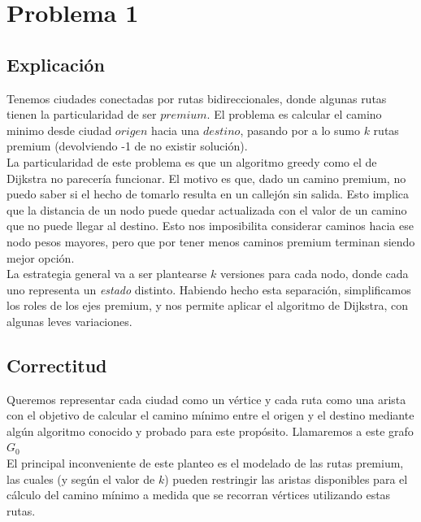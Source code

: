 
\section{Problema 1}

\subsection{Explicación}

Tenemos ciudades conectadas por rutas bidireccionales, donde algunas rutas tienen la particularidad de ser $premium$. El problema es calcular el camino minimo desde ciudad $origen$ hacia una $destino$, pasando por a lo sumo $k$ rutas premium (devolviendo -1 de no existir solución). \\

La particularidad de este problema es que un algoritmo greedy como el de Dijkstra no parecería funcionar. El motivo es que, dado un camino premium, no puedo saber si el hecho de tomarlo resulta en un callejón sin salida. Esto implica que la distancia de un nodo puede quedar actualizada con el valor de un camino que no puede llegar al destino. Esto nos imposibilita considerar caminos hacia ese nodo pesos mayores, pero que por tener menos caminos premium terminan siendo mejor opción. \\

La estrategia general va a ser plantearse $k$ versiones para cada nodo, donde cada uno representa un \textit{estado} distinto. Habiendo hecho esta separación, simplificamos los roles de los ejes premium, y nos permite aplicar el algoritmo de Dijkstra, con algunas leves variaciones.

\subsection{Correctitud}
Queremos representar cada ciudad como un vértice y cada ruta como una arista con el objetivo de calcular el camino mínimo entre el origen y el destino mediante algún algoritmo conocido y probado para este propósito. Llamaremos a este grafo $G_0$\\

El principal inconveniente de este planteo es el modelado de las rutas premium, las cuales (y según el valor de $k$) pueden restringir las aristas disponibles para el cálculo del camino mínimo a medida que se recorran vértices utilizando estas rutas.\\

